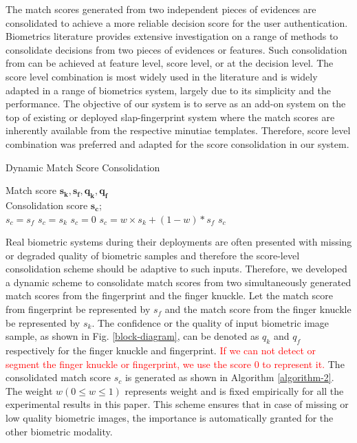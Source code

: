 The match scores generated from two independent pieces of evidences are consolidated to achieve a more reliable decision score for the user authentication. Biometrics literature \cite{maltoni2009handbook} provides extensive investigation on a range of methods to consolidate decisions from two pieces of evidences or features. Such consolidation from can be achieved at feature level, score level, or at the decision level. The score level combination is most widely used in the literature and is widely adapted \cite{jain2012biometric} in a range of biometrics system, largely due to its simplicity and the performance. The objective of our system is to serve as an add-on system on the top of existing or deployed slap-fingerprint system where the match scores are inherently available from the respective minutiae templates. Therefore, score level combination was preferred and adapted for the score consolidation in our system.  
\begin{algorithm}[h!]
    \renewcommand{\algorithmicrequire}{\textbf{Input:}}
    \renewcommand{\algorithmicensure}{\textbf{Output:}}
    \caption{Dynamic Match Score Consolidation}
    \begin{algorithmic}[1]
        \REQUIRE Match score $\bm{s_k, s_f, q_k, q_f}$ \\ 
        \ENSURE Consolidation score $\bm{s_c}$;\\
            \STATE $s_c = s_f$
        \ENDIF
            \STATE $s_c = s_k$
        \ENDIF
            \STATE $s_c = 0$
        \ELSE
            \STATE $s_c = w \times s_k + (1-w)*s_f$
        \ENDIF
        \RETURN $s_c$
    \end{algorithmic}
    \label{algorithm-2}
\end{algorithm}

Real biometric systems during their deployments are often presented with missing or degraded quality of biometric samples and therefore the score-level consolidation scheme should be adaptive to such inputs. Therefore, we developed a dynamic scheme to consolidate match scores from two simultaneously generated match scores from the fingerprint and the finger knuckle. Let the match score from fingerprint be represented by $s_f$ and the match score from the finger knuckle be represented by $s_k$. The confidence or the quality of input biometric image sample, as shown in Fig. \ref{block-diagram}, can be denoted as $q_k$ and $q_f$ respectively for the finger knuckle and fingerprint. \textcolor{red}{If we can not detect or segment the finger knuckle or fingerprint, we use the score 0 to represent it.} The consolidated match score $s_c$ is generated as shown in Algorithm \ref{algorithm-2}. The weight $w ( 0 \leq w \leq 1)$  represents weight and is fixed empirically for all the experimental results in this paper. This scheme ensures that in case of missing or low quality biometric images, the importance is automatically granted for the other biometric modality.  

